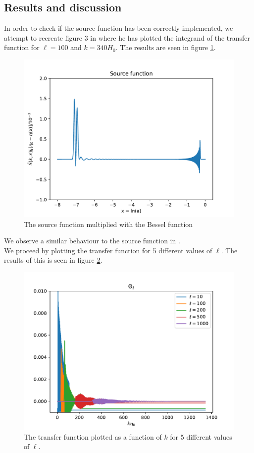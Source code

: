 \documentclass{aa}
\begin{document}
\subsection{Results and discussion}
In order to check if the source function has been correctly implemented, we attempt to recreate figure 3 in \cite{5} where he has plotted the integrand of the transfer function for $\ell = 100$ and $k = 340H_0$. The results are seen in figure \ref{fig:M4_source}.


\begin{figure}[h!]
   \includegraphics[scale=0.5]{Figures/milestone_4/source_function.pdf}
   \caption{The source function multiplied with the Bessel function}
   \label{fig:M4_source}
\end{figure}
We observe a similar behaviour to the source function in \cite{5}. 
\\
We proceed by plotting the transfer function for 5 different values of $\ell$. The results of this is seen in figure \ref{fig:M4_ustf}.
\begin{figure}[h!]
   \includegraphics[scale=0.5]{Figures/milestone_4/unscaled_transfer_function.pdf}
   \caption{The transfer function plotted as a function of $k$ for 5 different values of $\ell$.}
   \label{fig:M4_ustf}
\end{figure} \\
\end{document}
